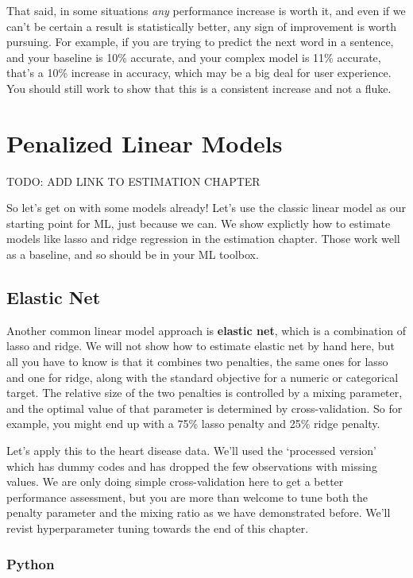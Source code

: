 \documentclass[
  letterpaper,
]{krantz}
\begin{document}
That said, in some situations \emph{any} performance increase is worth
it, and even if we can't be certain a result is statistically better,
any sign of improvement is worth pursuing. For example, if you are
trying to predict the next word in a sentence, and your baseline is 10\%
accurate, and your complex model is 11\% accurate, that's a 10\%
increase in accuracy, which may be a big deal for user experience. You
should still work to show that this is a consistent increase and not a
fluke.

\section{Penalized Linear Models}\label{penalized-linear-models}

TODO: ADD LINK TO ESTIMATION CHAPTER

So let's get on with some models already! Let's use the classic linear
model as our starting point for ML, just because we can. We show
explictly how to estimate models like lasso and ridge regression in the
estimation chapter. Those work well as a baseline, and so should be in
your ML toolbox.

\subsection{Elastic Net}\label{elastic-net}

Another common linear model approach is \textbf{elastic net}, which is a
combination of lasso and ridge. We will not show how to estimate elastic
net by hand here, but all you have to know is that it combines two
penalties, the same ones for lasso and one for ridge, along with the
standard objective for a numeric or categorical target. The relative
size of the two penalties is controlled by a mixing parameter, and the
optimal value of that parameter is determined by cross-validation. So
for example, you might end up with a 75\% lasso penalty and 25\% ridge
penalty.

Let's apply this to the heart disease data. We'll used the `processed
version' which has dummy codes and has dropped the few observations with
missing values. We are only doing simple cross-validation here to get a
better performance assessment, but you are more than welcome to tune
both the penalty parameter and the mixing ratio as we have demonstrated
before. We'll revist hyperparameter tuning towards the end of this
chapter.

\subsubsection{Python}
\end{document}
